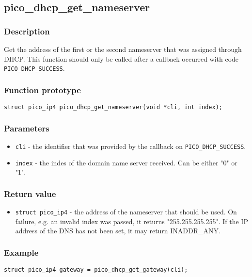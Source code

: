 \subsection{pico\_dhcp\_get\_nameserver}

\subsubsection*{Description}
Get the address of the first or the second nameserver that was assigned through DHCP. 
This function should only be called after a callback occurred with code \texttt{PICO\_DHCP\_SUCCESS}. 

\subsubsection*{Function prototype}
\texttt{struct pico\_ip4 pico\_dhcp\_get\_nameserver(void *cli, int index);}

\subsubsection*{Parameters}
\begin{itemize}[noitemsep]
\item \texttt{cli} - the identifier that was provided by the callback on \texttt{PICO\_DHCP\_SUCCESS}.
\item \texttt{index} - the indes of the domain name server received. Can be either "0" or "1".
\end{itemize}

\subsubsection*{Return value}
\begin{itemize}[noitemsep]
\item \texttt{struct pico\_ip4} - the address of the nameserver that should be used. On failure, e.g. an invalid index was passed, it returns "255.255.255.255". If the IP address of the DNS has not been set, it may return INADDR\_ANY.
\end{itemize}



\subsubsection*{Example}
\begin{verbatim}
struct pico_ip4 gateway = pico_dhcp_get_gateway(cli);
\end{verbatim}
